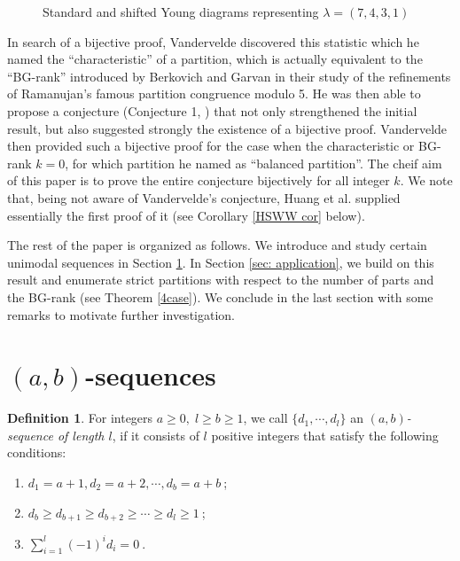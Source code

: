 \documentclass[12pt,reqno]{amsart}
\numberwithin{equation}{section}
\theoremstyle{plain}
\theoremstyle{definition}
\newtheorem{Def}[theorem]{Definition}
\begin{document}
\begin{figure}[htp]\label{shiftY}
\begin{ferrers}
\putright
{}
\end{ferrers}
\caption{Standard and shifted Young diagrams representing $\lambda=(7,4,3,1)$}
\end{figure}

In search of a bijective proof, Vandervelde discovered this statistic which he named the ``characteristic'' of a partition, which is actually equivalent to the ``BG-rank'' introduced by Berkovich and Garvan \cite{BG} in their study of the refinements of Ramanujan's famous partition congruence modulo 5. He was then able to propose a conjecture (Conjecture 1, \cite{Van}) that not only strengthened the initial result, but also suggested strongly the existence of a bijective
proof. Vandervelde then provided such a bijective proof for the case when the characteristic or BG-rank $k=0$, for which partition he named as ``balanced partition''. The cheif aim of this paper is to prove the entire conjecture bijectively for all integer $k$. We note that, being not aware of Vandervelde's conjecture, Huang et al. \cite{HSWW} supplied essentially the first proof of it (see Corollary \ref{HSWW cor} below).

The rest of the paper is organized as follows. We introduce and study certain unimodal sequences in Section \ref{sec2: main theorem}. In Section \ref{sec: application}, we build on this result and enumerate strict partitions with respect to the number of parts and the BG-rank (see Theorem \ref{4case}). We conclude in the last section with some remarks to motivate further investigation.



\section{$(a,b)$-sequences}\label{sec2: main theorem}

\begin{Def}\label{abseq}
For integers $a\ge 0,\; l\ge b\ge 1$, we call $\{d_1,\cdots,d_l\}$ an \emph{$(a,b)$-sequence of length $l$}, if it consists of $l$ positive integers that satisfy the following conditions:
\begin{enumerate}[1)]
\item $d_1=a+1, d_2=a+2,\cdots,d_b=a+b~$;
\item $d_b\ge d_{b+1}\ge d_{b+2}\ge \cdots \ge d_l\ge 1~$;
\item $\sum_{i=1}^{l}(-1)^{i}d_i=0~$.
\end{enumerate}
\end{Def}
\end{document}

